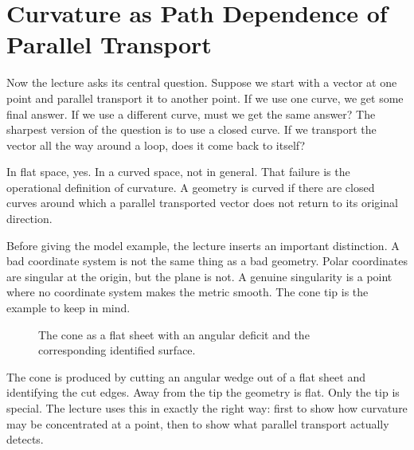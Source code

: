 \section{Curvature as Path Dependence of Parallel Transport}

Now the lecture asks its central question. Suppose we start with a vector at one point and parallel transport it to another point. If we use one curve, we get some final answer. If we use a different curve, must we get the same answer? The sharpest version of the question is to use a closed curve. If we transport the vector all the way around a loop, does it come back to itself?

In flat space, yes. In a curved space, not in general. That failure is the operational definition of curvature. A geometry is curved if there are closed curves around which a parallel transported vector does not return to its original direction.

Before giving the model example, the lecture inserts an important distinction. A bad coordinate system is not the same thing as a bad geometry. Polar coordinates are singular at the origin, but the plane is not. A genuine singularity is a point where no coordinate system makes the metric smooth. The cone tip is the example to keep in mind.

\begin{figure}[h]
\centering
{}%
\caption{The cone as a flat sheet with an angular deficit and the corresponding identified surface.}
\end{figure}

The cone is produced by cutting an angular wedge out of a flat sheet and identifying the cut edges. Away from the tip the geometry is flat. Only the tip is special. The lecture uses this in exactly the right way: first to show how curvature may be concentrated at a point, then to show what parallel transport actually detects.

